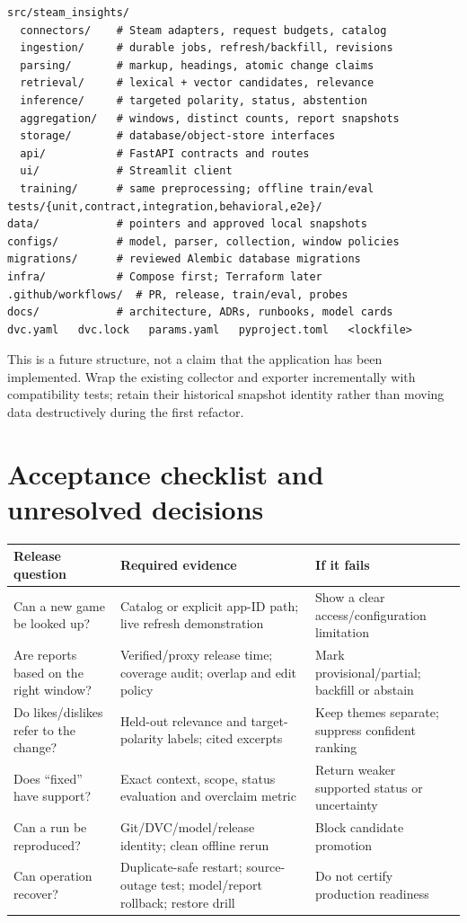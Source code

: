 \documentclass[10pt,letterpaper]{article}
\newcommand{\nextsection}[1]{\clearpage\section{#1}}
\begin{document}
\begin{lstlisting}
src/steam_insights/
  connectors/    # Steam adapters, request budgets, catalog
  ingestion/     # durable jobs, refresh/backfill, revisions
  parsing/       # markup, headings, atomic change claims
  retrieval/     # lexical + vector candidates, relevance
  inference/     # targeted polarity, status, abstention
  aggregation/   # windows, distinct counts, report snapshots
  storage/       # database/object-store interfaces
  api/           # FastAPI contracts and routes
  ui/            # Streamlit client
  training/      # same preprocessing; offline train/eval
tests/{unit,contract,integration,behavioral,e2e}/
data/            # pointers and approved local snapshots
configs/         # model, parser, collection, window policies
migrations/      # reviewed Alembic database migrations
infra/           # Compose first; Terraform later
.github/workflows/  # PR, release, train/eval, probes
docs/            # architecture, ADRs, runbooks, model cards
dvc.yaml   dvc.lock   params.yaml   pyproject.toml   <lockfile>
\end{lstlisting}
This is a future structure, not a claim that the application has been implemented. Wrap the existing collector and exporter incrementally with compatibility tests; retain their historical snapshot identity rather than moving data destructively during the first refactor.

\nextsection{Acceptance checklist and unresolved decisions}
\begin{tabularx}{\linewidth}{p{1.1in}YY}
\toprule
Release question & Required evidence & If it fails \\
\midrule
Can a new game be looked up? & Catalog or explicit app-ID path; live refresh demonstration & Show a clear access/configuration limitation \\
Are reports based on the right window? & Verified/proxy release time; coverage audit; overlap and edit policy & Mark provisional/partial; backfill or abstain \\
Do likes/dislikes refer to the change? & Held-out relevance and target-polarity labels; cited excerpts & Keep themes separate; suppress confident ranking \\
Does ``fixed'' have support? & Exact context, scope, status evaluation and overclaim metric & Return weaker supported status or uncertainty \\
Can a run be reproduced? & Git/DVC/model/release identity; clean offline rerun & Block candidate promotion \\
Can operation recover? & Duplicate-safe restart; source-outage test; model/report rollback; restore drill & Do not certify production readiness \\
\bottomrule
\end{tabularx}
\end{document}
